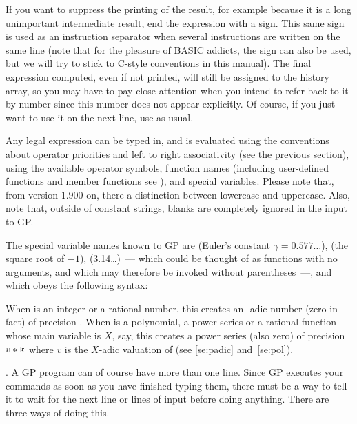 If you want to suppress the printing of the result, for example because it
is a long unimportant intermediate result, end the expression with a
\kbd{;} sign. This same sign is used as an instruction separator when several
instructions are written on the same line (note that for the pleasure of BASIC
addicts, the \kbd{:} sign can also be used, but we will try to stick to
C-style conventions in this manual). The final expression computed, even
if not printed, will still be assigned to the history array, so you may have
to pay close attention when you intend to refer back to it by number since
this number does not appear explicitly. Of course, if you just want to use
it on the next line, use \kbd{\%} as usual.

Any legal expression can be typed in, and is evaluated using the
conventions about operator priorities and left to right associativity (see
the previous section), using the available operator symbols, function names
(including user-defined functions and member functions see
), and special variables. Please note that, from
version $1.900$ on, there  a distinction
between lowercase and uppercase. Also, note that, outside of constant
strings, blanks are completely ignored in the input to GP.

The special variable names known to GP are
 (Euler's constant $\gamma=0.577\dots$),  (the
square root of $-1$),  (3.14\dots)~--- which could be thought of as
functions with no arguments, and which may therefore be invoked without
parentheses~---, and  which obeys the following syntax:


\noindent
When  is an integer or a rational number, this creates an
-adic number (zero in fact) of precision . When 
is a polynomial, a power series or a rational function whose main variable is
$X$, say, this creates a power series (also zero) of precision $v*{\tt k}$
where $v$ is the $X$-adic valuation of  (see \ref{se:padic}
and~\ref{se:pol}).

. A GP program
can of course have more than one line. Since GP executes your commands as
soon as you have finished typing them, there must be a way to tell it to
wait for the next line or lines of input before doing anything. There are
three ways of doing this.

